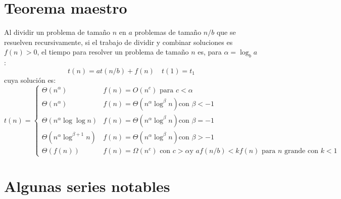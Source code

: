 \documentclass[english, spanish, fleqn]{article}
\begin{document}
\section*{Teorema maestro}
\label{sec:teorema-maestro}

  Al dividir un problema de tamaño \(n\)
  en \(a\) problemas de tamaño \(n / b\)
  que se resuelven recursivamente,
  si el trabajo de dividir y combinar soluciones es \(f(n) > 0\),
  el tiempo para resolver un problema de tamaño \(n\) es,
  para \(\alpha = \log_b a\):
  \begin{equation*}
    t(n)
      = a t(n / b) + f(n)
    \quad t(1) = t_1
  \end{equation*}
  cuya solución es:
  \begin{equation*}
    t(n)
      = \begin{cases}
          \Theta(n^\alpha)
             & \text{\(f(n) = O(n^c)\) para \(c < \alpha\)} \\
          \Theta(n^\alpha)
             & \text{\(f(n) = \Theta(n^\alpha \log^\beta n)\)
                     con \(\beta < -1\)} \\
          \Theta(n^\alpha \log \log n)
             & \text{\(f(n) = \Theta(n^\alpha \log^\beta n)\)
                     con \(\beta = -1\)} \\
          \Theta(n^\alpha \log^{\beta + 1} n)
             & \text{\(f(n) = \Theta(n^\alpha \log^\beta n)\)
                     con \(\beta > -1\)} \\
          \Theta(f(n))
            & \text{\(f(n) = \Omega(n^c)\) con \(c > \alpha\)
                    y \(a f(n / b) < k f(n)\) para \(n\) grande
                    con \(k < 1\)}
        \end{cases}
  \end{equation*}

\section*{Algunas series notables}
\label{sec:series}
\end{document}
